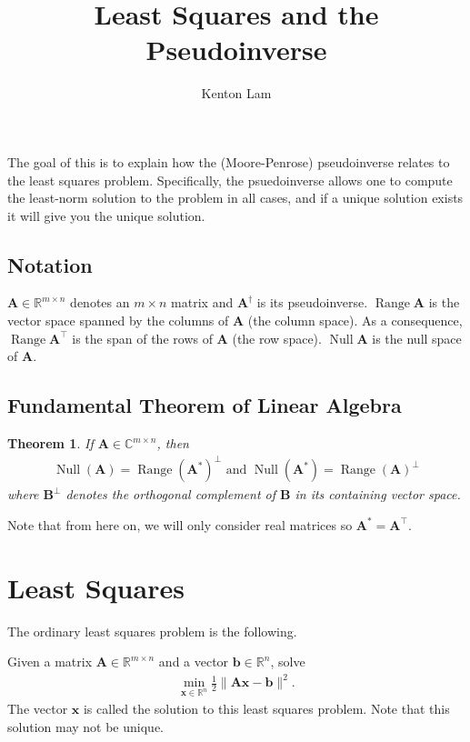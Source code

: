\documentclass[12pt,a4paper]{article} %
\title{Least Squares and the Pseudoinverse}
\author{Kenton Lam}
\newtheorem*{theorem}{Theorem}
\DeclareMathOperator{\Range}{Range}
\DeclareMathOperator{\Null}{Null}
\begin{document}
\maketitle

The goal of this is to explain how the (Moore-Penrose) pseudoinverse relates 
to the least squares problem. Specifically, the psuedoinverse allows one to 
compute the least-norm solution to the problem in all cases, 
and if a unique solution exists it will give you the unique solution.

\subsection*{Notation}
$\mathbf A \in \mathbb R^{m \times n}$ denotes an $m \times n$ matrix 
and $\mathbf A^\dagger$ is its pseudoinverse. $\Range \mathbf A$ is the vector space 
spanned by the columns of $\mathbf A$ (the column space). As a consequence, $\Range \mathbf A^\top$ is 
the span of the rows of $\mathbf A$ (the row space). $\Null \mathbf A$ is the null space of $\mathbf A$.

\subsection*{Fundamental Theorem of Linear Algebra}
\begin{theorem}
    If $\mathbf A \in \mathbb C^{m \times n}$, then 
    \begin{align*}
        \Null (\mathbf A) = \Range (\mathbf A^*)^\perp \text{ and }
        \Null (\mathbf A^*) = \Range(\mathbf A)^\perp
    \end{align*}
    where $\mathbf B^\perp$ denotes the orthogonal complement of $\mathbf B$ in its 
    containing vector space.
\end{theorem}
Note that from here on, we will only consider real matrices so $\mathbf A^* = \mathbf A^\top$.

\section{Least Squares}
The ordinary least squares problem is the following.

Given a matrix $\mathbf A \in \mathbb R^{m \times n}$ 
and a vector $\bm b \in \mathbb R^{n}$, solve
\begin{align*}
    \min_{\bm x \in \mathbb R^n} \frac{1}{2} \| \mathbf A \bm x - \bm b \| ^2.
\end{align*}
The vector $\bm x$ is called the solution to this least squares problem. Note that this 
solution may not be unique.
\end{document}
